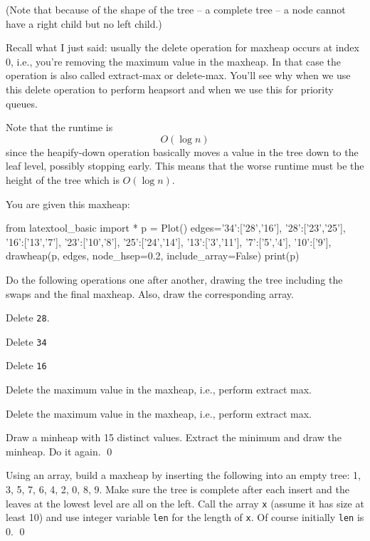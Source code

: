 (Note that because of the shape of the tree -- a complete tree --
a node cannot have a right child but no left child.)

Recall what I just said: usually the delete operation for maxheap
occurs at index 0, i.e., you're removing the maximum value in the maxheap.
In that case the operation is also called extract-max or delete-max.
You'll see why when we use this delete operation to perform heapsort
and when we use this for priority queues.

Note that the runtime is
\[
  O(\log n)
\]
since the heapify-down operation basically moves
a value in the tree down to the leaf level, possibly stopping
early.
This means that the worse runtime must be
the height of the tree which is $O(\log n)$.

\newpage
\begin{ex}
  You are given this maxheap:

  
  from latextool_basic import *
  p = Plot()
  edges={'34':['28','16'],
  '28':['23','25'],
  '16':['13','7'],
  '23':['10','8'],
  '25':['24','14'],
  '13':['3','11'],
  '7':['5','4'],
  '10':['9'],
  }
  drawheap(p, edges, node_hsep=0.2,
  include_array=False)
  print(p)

  Do the following operations one after another,
  drawing the tree including the swaps
  and the final
  maxheap.
  Also, draw the corresponding array.
  \begin{tightlist}
  \item Delete \texttt{28}.
  \item Delete \texttt{34}
  \item Delete \texttt{16}
  \item Delete the maximum value in the maxheap, i.e., perform extract max.
  \item Delete the maximum value in the maxheap, i.e., perform extract max.
  \end{tightlist}
\end{ex}

\newpage
\begin{ex}
  Draw a minheap with 15 distinct values.
  Extract the minimum and draw the minheap.
  Do it again.
  \qed
\end{ex}





\begin{ex}
  Using an array, 
  build a maxheap by inserting the following into an empty tree:
  1, 3, 5, 7, 6, 4, 2, 0, 8, 9.
  Make sure the tree is complete after each insert and the leaves
  at the lowest level are all on the left.
  Call the array \texttt{x}
  (assume it has size at least 10)
  and use integer variable \texttt{len}
  for the length of \texttt{x}.
  Of course initially \texttt{len} is 0.
  \qed
\end{ex}


